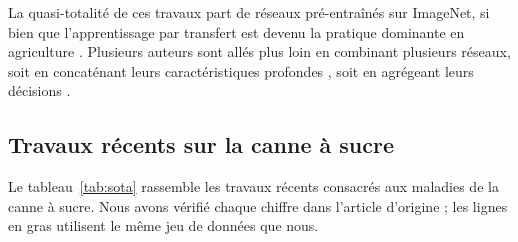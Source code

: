 La quasi-totalité de ces travaux part de réseaux pré-entraînés sur ImageNet, si bien que l'apprentissage par transfert est devenu la pratique dominante en agriculture \cite{kamilaris2018dl}. Plusieurs auteurs sont allés plus loin en combinant plusieurs réseaux, soit en concaténant leurs caractéristiques profondes \cite{khan2018ccdf, ji2020unitedmodel, sutaji2022lemoxinet}, soit en agrégeant leurs décisions \cite{turkoglu2022plantdiseasenet}.

\subsection{Travaux récents sur la canne à sucre}

Le tableau~\ref{tab:sota} rassemble les travaux récents consacrés aux maladies de la canne à sucre. Nous avons vérifié chaque chiffre dans l'article d'origine ; les lignes en gras utilisent le même jeu de données que nous.

